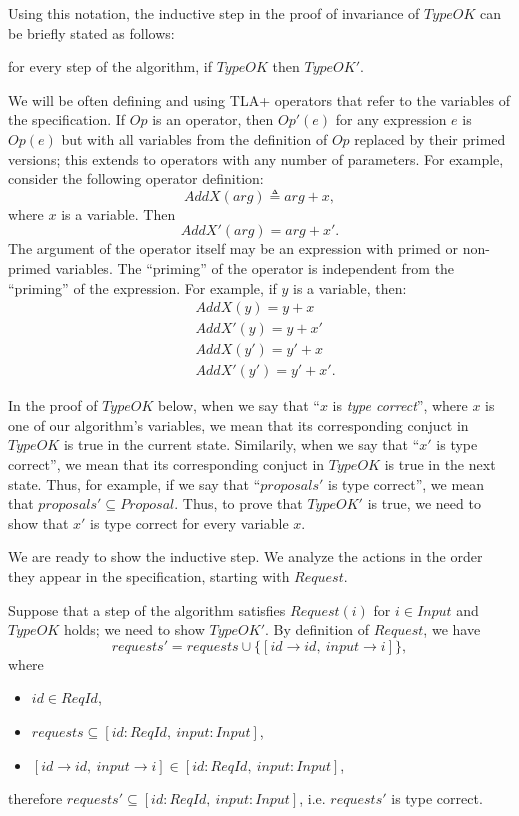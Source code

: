 \documentclass[12pt,a4paper,en]{pracamgr}
\newcommand{\ti}[1]{\textit{#1}}
\begin{document}
Using this notation, the inductive step in the proof of invariance of $TypeOK$ can be briefly stated as follows:
\begin{center} for every step of the algorithm, if $TypeOK$ then $TypeOK'$. \end{center}

We will be often defining and using TLA+ operators that refer to the variables of the specification. If $Op$ is an operator, then $Op'(e)$ for any expression $e$ is $Op(e)$ but with all variables from the definition of $Op$ replaced by their primed versions; this extends to operators with any number of parameters. For example, consider the following operator definition:
$$ AddX(arg) \triangleq arg + x, $$
where $x$ is a variable. Then
$$AddX'(arg) = arg + x'. $$
The argument of the operator itself may be an expression with primed or non-primed variables. The ``priming'' of the operator is independent from the ``priming'' of the expression. For example, if $y$ is a variable, then:
\begin{align*}
    & AddX(y) = y + x\\
    & AddX'(y) = y + x'\\
    & AddX(y') = y' + x\\
    & AddX'(y') = y' + x'.
\end{align*}

In the proof of $TypeOK$ below, when we say that ``$x$ is \ti{type correct}'', where $x$ is one of our algorithm's variables,  we mean that its corresponding conjuct in $TypeOK$ is true in the current state. Similarily, when we say that ``$x'$ is type correct'', we mean that its corresponding conjuct in $TypeOK$ is true in the next state. Thus, for example, if we say that ``$proposals'$ is type correct'', we mean that $proposals' \subseteq Proposal$. Thus, to prove that $TypeOK'$ is true, we need to show that $x'$ is type correct for every variable $x$.

We are ready to show the inductive step. We analyze the actions in the order they appear in the specification, starting with $Request$.

Suppose that a step of the algorithm satisfies $Request(i)$ for $i \in Input$ and $TypeOK$ holds; we need to show $TypeOK'$. By definition of $Request$, we have
$$ requests' = requests \cup \{[id \rightarrow id,\ input \rightarrow i]\}, $$
where
\begin{itemize}
    \item $id \in ReqId$,
    \item $requests \subseteq [id: ReqId,\ input: Input]$,
    \item $[id \rightarrow id,\ input \rightarrow i] \in [id: ReqId,\ input: Input]$,
\end{itemize}
therefore $requests' \subseteq [id: ReqId,\ input: Input]$, i.e. $requests'$ is type correct.
\end{document}
